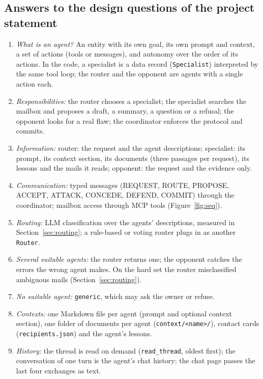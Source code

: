 \documentclass[11pt,a4paper]{article}
\newcommand{\code}[1]{\texttt{#1}}
\begin{document}
\subsection{Answers to the design questions of the project statement}
\begin{enumerate}
  \item \emph{What is an agent?} An entity with its own goal, its own prompt and context, a set of actions (tools or
        messages), and autonomy over the order of its actions. In the code, a specialist is a data record
        (\code{Specialist}) interpreted by the same tool loop; the router and the opponent are agents with a single action each.
  \item \emph{Responsibilities:} the router chooses a specialist; the specialist searches the mailbox and proposes a draft,
        a summary, a question or a refusal; the opponent looks for a real flaw; the coordinator enforces the protocol and commits.
  \item \emph{Information:} router: the request and the agent descriptions; specialist: its prompt, its context section, its
        documents (three passages per request), its lessons and the mails it reads; opponent: the request and the evidence only.
  \item \emph{Communication:} typed messages (REQUEST, ROUTE, PROPOSE, ACCEPT, ATTACK, CONCEDE, DEFEND, COMMIT) through
        the coordinator; mailbox access through MCP tools (Figure~\ref{fig:seq}).
  \item \emph{Routing:} LLM classification over the agents' descriptions, measured in Section~\ref{sec:routing}; a rule-based
        or voting router plugs in as another \code{Router}.
  \item \emph{Several suitable agents:} the router returns one; the opponent catches the errors the wrong agent makes. On the
        hard set the router misclassified ambiguous mails (Section~\ref{sec:routing}).
  \item \emph{No suitable agent:} \code{generic}, which may ask the owner or refuse.
  \item \emph{Contexts:} one Markdown file per agent (prompt and optional context section), one folder of documents per agent
        (\code{context/<name>/}), contact cards (\code{recipients.json}) and the agent's lessons.
  \item \emph{History:} the thread is read on demand (\code{read\_thread}, oldest first); the conversation of one turn is the
        agent's chat history; the chat page passes the last four exchanges as text.

\end{enumerate}
\end{document}

